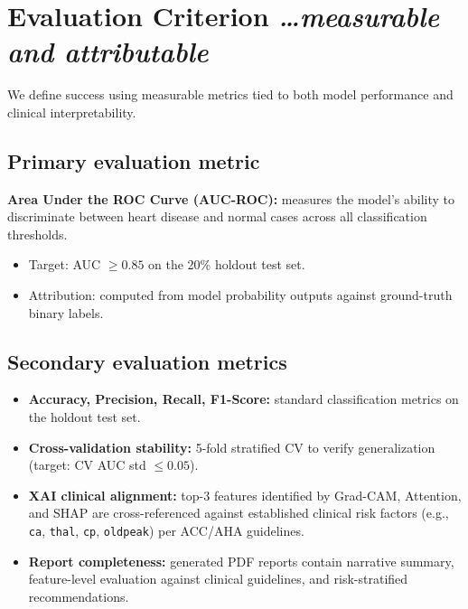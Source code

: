 \documentclass[11pt,a4paper]{article}
\newcommand{\BvrHint}[1]{%
  {\normalfont\normalsize\itshape\hfill #1}}
\begin{document}
\section{Evaluation Criterion%
  \BvrHint{\ldots measurable and attributable}}
We define success using measurable metrics tied to both model
performance and clinical interpretability.

\subsection{Primary evaluation metric}
\textbf{Area Under the ROC Curve (AUC-ROC):} measures the
model's ability to discriminate between heart disease and
normal cases across all classification thresholds.
\begin{itemize}[leftmargin=0.7cm]
    \item Target: AUC $\geq 0.85$ on the 20\% holdout test set.
    \item Attribution: computed from model probability outputs
      against ground-truth binary labels.
\end{itemize}

\subsection{Secondary evaluation metrics}
\begin{itemize}[leftmargin=0.7cm]
    \item \textbf{Accuracy, Precision, Recall, F1-Score:}
      standard classification metrics on the holdout test set.
    \item \textbf{Cross-validation stability:} 5-fold stratified
      CV to verify generalization (target: CV AUC std $\leq 0.05$).
    \item \textbf{XAI clinical alignment:} top-3 features
      identified by Grad-CAM, Attention, and SHAP are
      cross-referenced against established clinical risk factors
      (e.g., \texttt{ca}, \texttt{thal}, \texttt{cp},
      \texttt{oldpeak}) per ACC/AHA guidelines.
    \item \textbf{Report completeness:} generated PDF reports
      contain narrative summary, feature-level evaluation against
      clinical guidelines, and risk-stratified recommendations.
\end{itemize}
\end{document}
